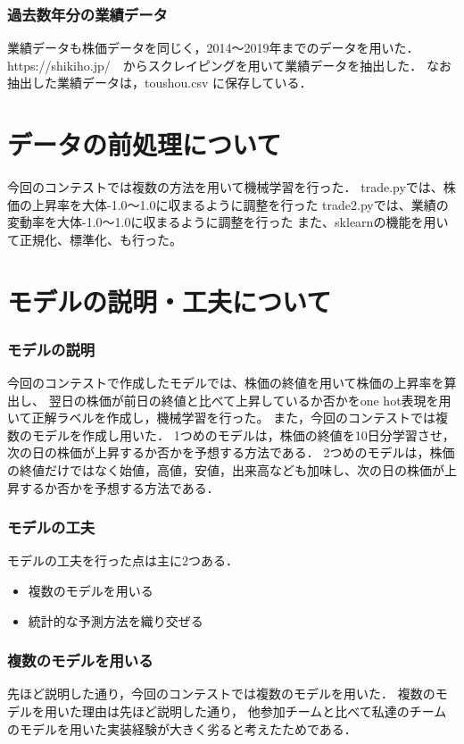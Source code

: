 \documentclass{jsarticle}
\begin{document}
\subsubsection{過去数年分の業績データ}
業績データも株価データを同じく，2014〜2019年までのデータを用いた．
https:\slash{}\slash{}shikiho.jp\slash　からスクレイピングを用いて業績データを抽出した．
なお抽出した業績データは，toushou.csv に保存している．

\section{データの前処理について}
今回のコンテストでは複数の方法を用いて機械学習を行った．
trade.pyでは、株価の上昇率を大体-1.0〜1.0に収まるように調整を行った
trade2.pyでは、業績の変動率を大体-1.0〜1.0に収まるように調整を行った
また、sklearnの機能を用いて正規化、標準化、も行った。

\section{モデルの説明・工夫について}

\subsubsection{モデルの説明}
今回のコンテストで作成したモデルでは、株価の終値を用いて株価の上昇率を算出し、
翌日の株価が前日の終値と比べて上昇しているか否かをone hot表現を用いて正解ラベルを作成し，機械学習を行った。
また，今回のコンテストでは複数のモデルを作成し用いた．
1つめのモデルは，株価の終値を10日分学習させ，次の日の株価が上昇するか否かを予想する方法である．
2つめのモデルは，株価の終値だけではなく始値，高値，安値，出来高なども加味し、次の日の株価が上昇するか否かを予想する方法である．

\subsubsection{モデルの工夫}
モデルの工夫を行った点は主に2つある．
\begin{itemize}
\item 複数のモデルを用いる
\item 統計的な予測方法を織り交ぜる
\end{itemize}

\subsubsection{複数のモデルを用いる}
先ほど説明した通り，今回のコンテストでは複数のモデルを用いた．
複数のモデルを用いた理由は先ほど説明した通り，
他参加チームと比べて私達のチームのモデルを用いた実装経験が大きく劣ると考えたためである．
\end{document}
